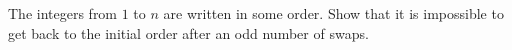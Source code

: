 The integers from $1$ to $n$ are written in some order. Show that it is impossible to get back to the initial order after an odd number of swaps.
